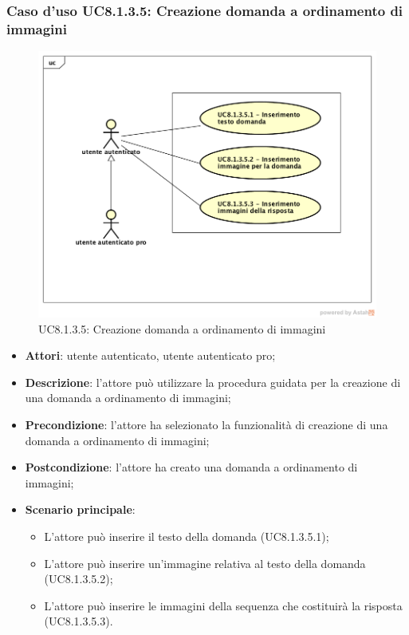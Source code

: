 \subsubsection{Caso d'uso UC8.1.3.5: Creazione domanda a ordinamento di immagini}
\label{UC8.1.3.5}
	\begin{figure}[h]
		\centering
			\includegraphics[scale=0.45,keepaspectratio]{UML/UC8_1_3_5.png}
		\caption{UC8.1.3.5: Creazione domanda a ordinamento di immagini}
	\end{figure}
	\FloatBarrier
\begin{itemize}
	\item\textbf{Attori}: utente autenticato, utente autenticato pro;
	\item\textbf{Descrizione}: l'attore può utilizzare la procedura guidata per la creazione di una domanda a ordinamento di immagini;
	\item\textbf{Precondizione}: l'attore ha selezionato la funzionalità di creazione di una domanda a ordinamento di immagini; 
	\item \textbf{Postcondizione}: l'attore ha creato una domanda a ordinamento di immagini;
	\item\textbf{Scenario principale}:
	\begin{itemize}
		\item L'attore può inserire il testo della domanda (UC8.1.3.5.1);
		\item L'attore può inserire un'immagine relativa al testo della domanda (UC8.1.3.5.2);
		\item L'attore può inserire le immagini della sequenza che costituirà la risposta (UC8.1.3.5.3).
	\end{itemize}
\end{itemize}

